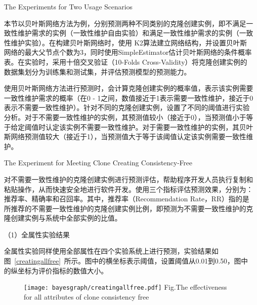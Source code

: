 {The Experiments for Two Usage Scenarios}

本节以贝叶斯网络方法为例，分别预测两种不同类别的克隆创建实例，即不满足一致性维护需求的实例（一致性维护自由实验）和满足一致性维护需求的实例（一致性维护实验）。在构建贝叶斯网络时，使用 K2算法建立网络结构，并设置贝叶斯网络的最大父节点个数为$3$，同时使用SimpleEstimator估计贝叶斯网络的条件概率表。在实验时，采用十倍交叉验证（10-Folds Cross-Validity）将克隆创建实例的数据集划分为训练集和测试集，并评估预测模型的预测能力。

使用贝叶斯网络方法进行预测时，会计算克隆创建实例的概率值，表示该实例需要一致性维护需求的概率（在0 - 1之间，数值接近于1表示需要一致性维护，接近于0表示不需要一致性维护）。针对不同的克隆创建实例，设置了不同的阈值进行实验分析。对于不需要一致性维护的实例，其预测值较小（接近于0），当预测值小于等于给定阈值时认定该实例不需要一致性维护。对于需要一致性维护的实例，其贝叶斯网络预测值较大（接近于1），当预测值大于等于该阈值认定该实例需要一致性维护。

{The Experiment for Meeting Clone Creating Consistency-Free}

对不需要一致性维护的克隆创建实例进行预测评估，帮助程序开发人员执行复制和粘贴操作，从而快速安全地进行软件开发。使用三个指标评估预测效果，分别为：推荐率、精确率和召回率。其中，推荐率（Recommendation Rate，RR）指的是所推荐的不需要一致性维护的克隆创建实例比例，即预测为不需要一致性维护的克隆创建实例与系统中全部实例的比值。


（1）全属性实验结果

全属性实验同样使用全部属性在四个实验系统上进行预测，实验结果如图~\ref{creatingallfree}~所示。图中的横坐标表示阈值，设置阈值从0.01到0.50，图中的纵坐标为评价指标的数值大小。

\begin{figure}[h]
\centering
\texttt{[image: bayesgraph/creatingallfree.pdf]}
{Fig.$\!$}{The effectiveness for all attributes of clone consistency free}
\vspace{-1em}
\end{figure}

